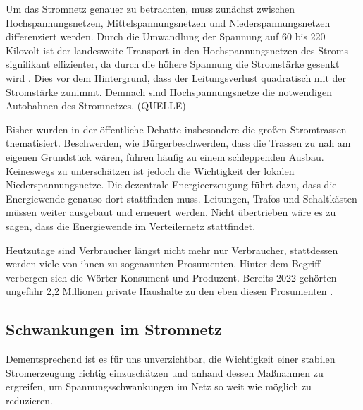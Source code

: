 \documentclass[12pt, a4paper]{article}
\begin{document}

Um das Stromnetz genauer zu betrachten, muss zunächst zwischen Hochspannungsnetzen, Mittelspannungsnetzen und Niederspannungsnetzen differenziert werden. Durch die Umwandlung der Spannung auf 60 bis 220 Kilovolt ist der landesweite Transport in den Hochspannungsnetzen des Stroms signifikant effizienter, da durch die höhere Spannung die Stromstärke gesenkt wird \cite{faz2023stromnetz}. Dies vor dem Hintergrund, dass der Leitungsverlust quadratisch mit der Stromstärke zunimmt. Demnach sind Hochspannungsnetze die notwendigen Autobahnen des Stromnetzes. (QUELLE)

Bisher wurden in der öffentliche Debatte insbesondere die großen Stromtrassen thematisiert. Beschwerden, wie Bürgerbeschwerden, dass die Trassen zu nah am eigenen Grundstück wären, führen häufig zu einem schleppenden Ausbau. Keineswegs zu unterschätzen ist jedoch die Wichtigkeit der lokalen Niederspannungsnetze. Die dezentrale Energieerzeugung führt dazu, dass die Energiewende genauso dort stattfinden muss. Leitungen, Trafos und Schaltkästen müssen weiter ausgebaut und erneuert werden. Nicht übertrieben wäre es zu sagen, dass die Energiewende im Verteilernetz stattfindet.

Heutzutage sind Verbraucher längst nicht mehr nur Verbraucher, stattdessen werden viele von ihnen zu sogenannten Prosumenten. Hinter dem Begriff verbergen sich die Wörter Konsument und Produzent. Bereits 2022 gehörten ungefähr 2,2 Millionen private Haushalte zu den eben diesen Prosumenten \cite{ws:destatis}. 




\subsection{Schwankungen im Stromnetz}

Dementsprechend ist es für uns unverzichtbar, die Wichtigkeit einer stabilen \linebreak Stromerzeugung richtig einzuschätzen und anhand dessen Maßnahmen zu ergreifen, um Spannungsschwankungen im Netz so weit wie möglich zu reduzieren.
\end{document}
